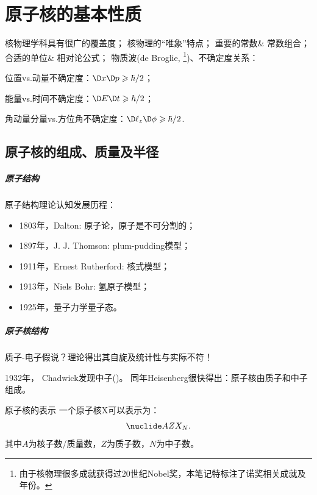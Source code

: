 \chapter{原子核的基本性质}

核物理学科具有很广的覆盖度；
核物理的“唯象”特点；
重要的常数\& 常数组合；
合适的单位\& 相对论公式；
物质波(de Broglie, \footnote{由于核物理很多成就获得过20世纪Nobel奖，本笔记特标注了诺奖相关成就及年份。})、不确定度关系：
\begin{compactenum}
	\item 位置vs.动量不确定度：$\D x\D p\geqslant\hbar/2$；
	\item 能量vs.时间不确定度：$\D E\D t\geqslant\hbar/2$；
	\item 角动量分量vs.方位角不确定度：$\D \ell_z\D\phi\geqslant\hbar/2$.
\end{compactenum}

\section{原子核的组成、质量及半径}

\paragraph{原子结构}

原子结构理论认知发展历程：
\begin{itemize}
	\item 1803年，Dalton: 原子论，原子是不可分割的；
	\item 1897年，J. J. Thomson: plum-pudding模型；
	\item 1911年，Ernest Rutherford: 核式模型；
	\item 1913年，Niels Bohr: 氢原子模型；
	\item 1925年，量子力学量子态。
\end{itemize}

\paragraph{原子核结构}
质子-电子假说？理论得出其自旋及统计性与实际不符！

1932年， Chadwick发现中子()。
同年Heisenberg很快得出：原子核由质子和中子组成。

\begin{definition}{原子核的表示}{}
	一个原子核X可以表示为：
	\[
		\nuclide AZX_N.
	\]
	其中$A$为核子数/质量数，$Z$为质子数，$N$为中子数。
	
\end{definition}

